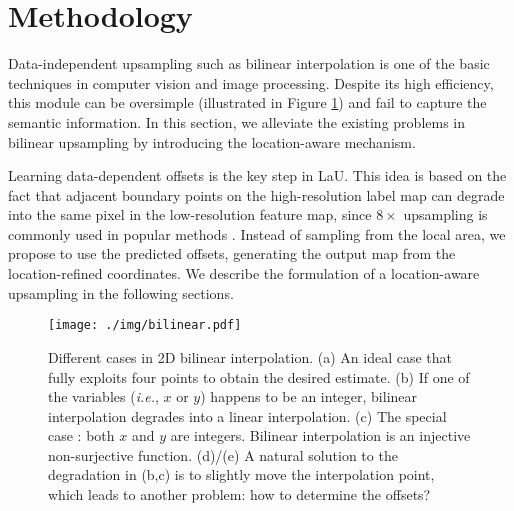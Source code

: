 \documentclass[10pt,twocolumn,letterpaper]{article}
\begin{document}
\section{Methodology}
Data-independent upsampling such as bilinear interpolation is one of the basic techniques in computer vision and image processing. Despite its high efficiency, this module can be oversimple (illustrated in Figure \ref{bilinear}) and fail to capture the semantic information. In this section, we alleviate the existing problems in bilinear upsampling by introducing the location-aware mechanism.

Learning data-dependent offsets is the key step in LaU. This idea is based on the fact that adjacent boundary points on the high-resolution label map can degrade into the same pixel in the low-resolution feature map, since $8\times$ upsampling is commonly used in popular methods \cite{ASPP,PSPNet,EncNet}. Instead of sampling from the local area, we propose to use the predicted offsets, generating the output map from the location-refined coordinates. We describe the formulation of a location-aware upsampling in the following sections.

\begin{figure}
  \centering
  \texttt{[image: ./img/bilinear.pdf]} 
  \caption{Different cases in 2D bilinear interpolation. (a) An ideal case that fully exploits four points to obtain the desired estimate. (b) If one of the variables (\textit{i.e.}, $x$ or $y$) happens to be an integer, bilinear interpolation degrades into a linear interpolation.  (c) The special case :  both $x$ and $y$ are integers. Bilinear interpolation is an injective non-surjective function. (d)/(e) A natural solution to the degradation in (b,c) is to slightly move the interpolation point, which leads to another problem: how to determine the offsets? }  
\label{bilinear}
\end{figure}
\end{document}
